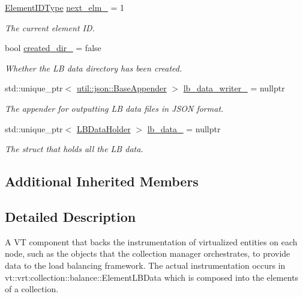 \begin{DoxyCompactItemize}
\hyperlink{namespacevt_1_1vrt_1_1collection_1_1balance_a592736f733df4f90856df90a1fd08905}{Element\+I\+D\+Type} \hyperlink{structvt_1_1vrt_1_1collection_1_1balance_1_1_node_l_b_data_a824c4e280138206d3fae1adb9c7f7e54}{next\+\_\+elm\+\_\+} = 1
\begin{DoxyCompactList}\small\item\em The current element ID. \end{DoxyCompactList}\item 
bool \hyperlink{structvt_1_1vrt_1_1collection_1_1balance_1_1_node_l_b_data_a9cccb7e2185485d798da41ca580460a9}{created\+\_\+dir\+\_\+} = false
\begin{DoxyCompactList}\small\item\em Whether the LB data directory has been created. \end{DoxyCompactList}\item 
std\+::unique\+\_\+ptr$<$ \hyperlink{structvt_1_1util_1_1json_1_1_base_appender}{util\+::json\+::\+Base\+Appender} $>$ \hyperlink{structvt_1_1vrt_1_1collection_1_1balance_1_1_node_l_b_data_a27ccfd9aa7b1cac52d508f7f42c38125}{lb\+\_\+data\+\_\+writer\+\_\+} = nullptr
\begin{DoxyCompactList}\small\item\em The appender for outputting LB data files in J\+S\+ON format. \end{DoxyCompactList}\item 
std\+::unique\+\_\+ptr$<$ \hyperlink{structvt_1_1vrt_1_1collection_1_1balance_1_1_l_b_data_holder}{L\+B\+Data\+Holder} $>$ \hyperlink{structvt_1_1vrt_1_1collection_1_1balance_1_1_node_l_b_data_aae1a8f7d4755acb52ece79124c6034c6}{lb\+\_\+data\+\_\+} = nullptr
\begin{DoxyCompactList}\small\item\em The struct that holds all the LB data. \end{DoxyCompactList}\end{DoxyCompactItemize}
\subsection*{Additional Inherited Members}


\subsection{Detailed Description}
A VT component that backs the instrumentation of virtualized entities on each node, such as the objects that the collection manager orchestrates, to provide data to the load balancing framework. The actual instrumentation occurs in {\ttfamily vt\+::vrt\+:collection\+:}\+:balance\+::\+Element\+L\+B\+Data which is composed into the elements of a collection. 

